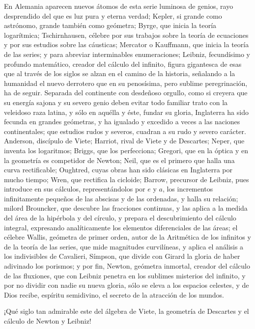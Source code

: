 \documentclass[a4paper, 12pt]{article}
\begin{document}
{{{{En Alemania aparecen nuevos átomos de esta serie luminosa de genios, rayo desprendido del que es luz pura y eterna verdad; Kepler, si grande como astrónomo, grande también como geómetra; Byrge, que inicia la teoría logarítmica; Tschirnhausen, célebre por sus trabajos sobre la teoría de ecuaciones y por sus estudios sobre las cáusticas; Mercator o Kauffmann, que inicia la teoría de las series; y para abreviar interminables enumeraciones; Leibniz, fecundísimo y profundo matemático, creador del cálculo del infinito, figura gigantesca de esas que al través de los siglos se alzan en el camino de la historia, señalando a la humanidad el nuevo derrotero que en su penosísima, pero sublime peregrinación, ha de seguir.  Separada del continente con desdeñoso orgullo, como si creyera que su energía sajona y su severo genio deben evitar todo familiar trato con la veleidoso raza latina, y sólo en aquélla y éste, fundar su gloria, Inglaterra ha sido fecunda en grandes geómetras, y ha igualado y excedido a veces a las naciones continentales; que estudios rudos y severos, cuadran a su rudo y severo carácter.  Anderson, discípulo de Viete; Harriot, rival de Viete y de Descartes; Neper, que inventa los logaritmos; Briggs, que los perfecciona; Gregori, que en la óptica y en la geometría es competidor de Newton; Neil, que es el primero que halla una curva rectificable;  Oughtred, cuyas obras han sido clásicas en Inglaterra por mucho tiempo; Wren, que rectifica la cicloide; Barrow, precursor de Leibniz, pues introduce en sus cálculos, representándolos por $e$ y $a$, los incrementos infinitamente pequeños de las abscisas y de las ordenadas, y halla su relación; milord Brouncker, que descubre las fracciones continuas, y las aplica a la medida del área de la hipérbola y del círculo, y prepara el descubrimiento del cálculo integral, expresando analíticamente los elementos diferenciales de las áreas; el célebre Wallis, geómetra de primer orden, autor de la Aritmética de los infinitos y de la teoría de las series, que mide magnitudes curvilíneas, y aplica el análisis a los indivisibles de Cavalieri, Símpson, que divide con Girard la gloria de haber adivinado los porismos; y por fin, Newton, geómetra inmortal, creador del cálculo de las fluxiones, que con Leibniz penetra en los sublimes misterios del infinito, y por no dividir con nadie su nueva gloria, sólo se eleva a los espacios celestes, y de Dios recibe, espíritu semidivino, el secreto de la atracción de los mundos.

¡Qué siglo tan admirable este del álgebra de Viete, la geometría de Descartes y el cálculo de Newton y Leibniz!

}}}}
\end{document}
